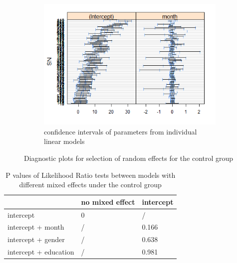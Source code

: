\begin{figure}[H]
\begin{subfigure}{.33\textwidth}
  \centering
  \includegraphics[width=1\linewidth]{../../plots/interval_control.png}
  \caption{confidence intervals of parameters from individual linear models}
\end{subfigure}
\caption{Diagnostic plots for selection of random effects for the control group}
\label{fig:diagnostic.control}
\end{figure}

\begin{table}[H]
\centering
\begin{tabular}{|l|l|l|}
\hline
& no mixed effect & intercept \\
\hline
intercept & 0 &/ \\
\hline
intercept + month &/ & 0.166 \\
\hline
intercept + gender &/ & 0.638 \\
\hline
intercept + education &/ & 0.981 \\
\hline
\end{tabular}
\caption{P values of Likelihood Ratio tests between models with different mixed effects under the control group}
\label{tab:model.comp.control.me.lrt}
\end{table}
